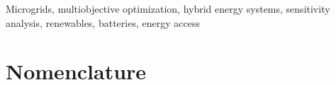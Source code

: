 \documentclass[final,3p,times]{elsarticle}
\begin{document}
\begin{frontmatter}
\begin{keyword}



Microgrids, multiobjective optimization, hybrid energy systems, sensitivity analysis, renewables, batteries, energy access

\end{keyword}

\end{frontmatter}

\section*{Nomenclature}
\end{document}
